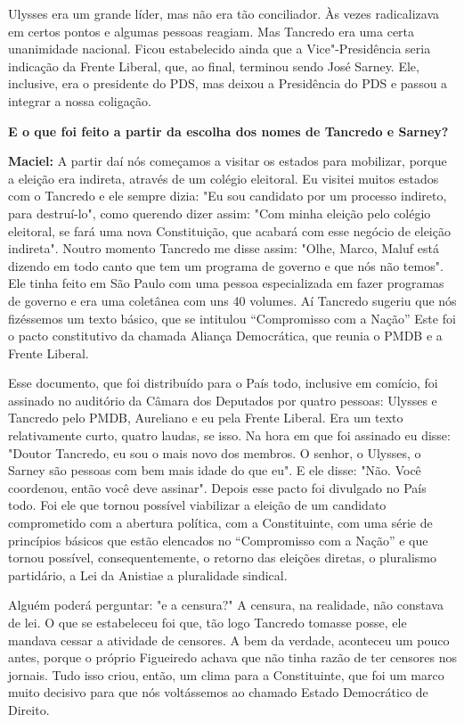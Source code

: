 Ulysses era um grande líder, mas não era tão conciliador. Às vezes
radicalizava em certos pontos e algumas pessoas reagiam. Mas Tancredo
era uma certa unanimidade nacional. Ficou estabelecido ainda que a
Vice"-Presidência seria indicação da Frente Liberal, que, ao final,
terminou sendo José Sarney. Ele, inclusive, era o presidente do PDS, mas
deixou a Presidência do PDS e passou a integrar a nossa coligação.

\textbf{E o que foi feito a partir da escolha dos nomes de Tancredo e
Sarney? }

\textbf{Maciel:} A partir daí nós começamos a visitar os estados para
mobilizar, porque a eleição era indireta, através de um colégio
eleitoral. Eu visitei muitos estados com o Tancredo e ele sempre dizia:
"Eu sou candidato por um processo indireto, para destruí-lo", como
querendo dizer assim: "Com minha eleição pelo colégio eleitoral, se fará
uma nova Constituição, que acabará com esse negócio de eleição
indireta". Noutro momento Tancredo me disse assim: "Olhe, Marco, Maluf
está dizendo em todo canto que tem um programa de governo e que nós não
temos". Ele tinha feito em São Paulo com uma pessoa especializada em
fazer programas de governo e era uma coletânea com uns 40 volumes. Aí
Tancredo sugeriu que nós fizéssemos um texto básico, que se intitulou
``Compromisso com a Nação'' Este foi o pacto constitutivo da chamada
Aliança Democrática, que reunia o PMDB e a Frente Liberal.

Esse documento, que foi distribuído para o País todo, inclusive em
comício, foi assinado no auditório da Câmara dos Deputados por quatro
pessoas: Ulysses e Tancredo pelo PMDB, Aureliano e eu pela Frente
Liberal. Era um texto relativamente curto, quatro laudas, se isso. Na
hora em que foi assinado eu disse: "Doutor Tancredo, eu sou o mais novo
dos membros. O senhor, o Ulysses, o Sarney são pessoas com bem mais
idade do que eu". E ele disse: "Não. Você coordenou, então você deve
assinar". Depois esse pacto foi divulgado no País todo. Foi ele que
tornou possível viabilizar a eleição de um candidato comprometido com a
abertura política, com a Constituinte, com uma série de princípios
básicos que estão elencados no ``Compromisso com a Nação'' e que tornou
possível, consequentemente, o retorno das eleições diretas, o pluralismo
partidário, a Lei da Anistiae a pluralidade sindical.

Alguém poderá perguntar: "e a censura?" A censura, na realidade, não
constava de lei. O que se estabeleceu foi que, tão logo Tancredo tomasse
posse, ele mandava cessar a atividade de censores. A bem da verdade,
aconteceu um pouco antes, porque o próprio Figueiredo achava que não
tinha razão de ter censores nos jornais. Tudo isso criou, então, um
clima para a Constituinte, que foi um marco muito decisivo para que nós
voltássemos ao chamado Estado Democrático de Direito.

